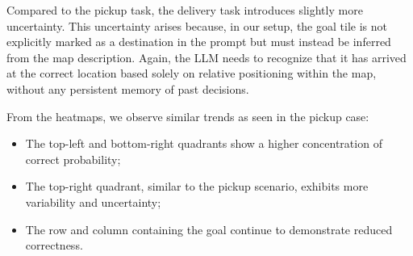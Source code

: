 Compared to the pickup task, the delivery task introduces slightly more uncertainty.
This uncertainty arises because, in our setup, the goal tile is not explicitly
marked as a destination in the prompt but must instead be inferred from the map
description. Again, the LLM needs to recognize that it has arrived at the
correct location based solely on relative positioning within the map, without any
persistent memory of past decisions.

From the heatmaps, we observe similar trends as seen in the pickup case:
\begin{itemize}
  \item The top-left and bottom-right quadrants show a higher concentration of correct
    probability;

  \item The top-right quadrant, similar to the pickup scenario, exhibits more variability
    and uncertainty;

  \item The row and column containing the goal continue to demonstrate reduced correctness.
\end{itemize}

